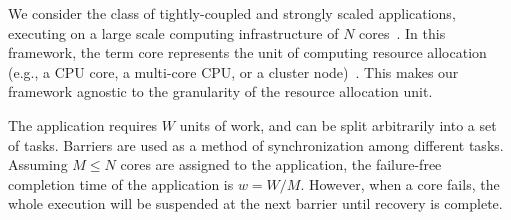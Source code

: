 We consider the class of tightly-coupled and strongly scaled applications, executing on a large scale computing infrastructure of $N$ cores~\cite{doe_ascr_exascale_2011}. In this framework, the term core represents the unit of computing resource allocation (e.g., a
CPU core, a multi-core CPU, or a cluster node)~\cite{casanova_inria_2012}. This makes our framework agnostic to the granularity of the resource allocation unit.


The application requires $W$ units of work, and can be split arbitrarily into a set of tasks.
Barriers are used as a method of synchronization among different tasks. Assuming $M \le N$ cores are assigned to the application, the failure-free completion time of the application is $w = W/M$. However, when a core fails, the whole execution will be suspended at the next barrier until recovery is complete. 


